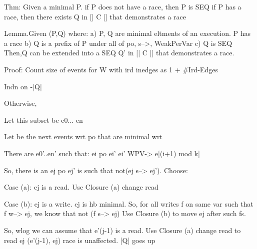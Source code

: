  
Thm:
Given a minimal P.
    if P does not have a race, then P is SEQ
    if P has a race, then there exists Q in [| C |] that demonstrates a race

Lemma.Given (P,Q) where:
          a) P, Q are minimal eltments of an execution.  P has a race
          b) Q is a prefix of P under all of po, s-->, WeakPerVar
          c) Q is SEQ
    Then,Q can be extended into a SEQ Q' in [| C |] that demonstrates a race.
          
Proof:    
Count size of events for W with ird inedges as 1 + #Ird-Edges 

Indn on -|Q|



Otherwise, 

Let this subset be e0... en

Let  be the next events wrt po that are minimal wrt 

  There are e0'..en'  such that:
                ei   po  ei'
                ei'  WPV-> e[(i+1) mod k]

  


  So, there is an ej po ej' is such that not(ej s--> ej').  Choose:

  Case (a): ej is a read.  
                  Use Closure (a) change read

  Case (b): ej is a write.
                 ej is hb minimal.
                 So, for all writes f on same var such that f w--> ej, we know that not (f s--> ej) 
                 Use Closure (b) to move ej after such fs.

                 So, wlog we can assume that e'(j-1) is a read.  
                 Use Closure (a) change read to read ej
                 (e'(j-1), ej) race is unaffected.
                 |Q| goes up

      